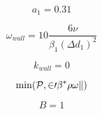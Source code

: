 {\newpage\clearpage
{}%
\begin{displaymath}
a_1 = 0.31
\end{displaymath}%
\lthtmldisplayZ
\lthtmlcheckvsize\clearpage}

{\newpage\clearpage
{}%
\begin{displaymath}
\omega_{wall} = 10 \frac{6 \nu}{\beta_1 (\Delta d_1)^2}
\end{displaymath}%
\lthtmldisplayZ
\lthtmlcheckvsize\clearpage}

{\newpage\clearpage
{}%
\begin{displaymath}
k_{wall} = 0
\end{displaymath}%
\lthtmldisplayZ
\lthtmlcheckvsize\clearpage}

{\newpage\clearpage
{}%
\begin{displaymath}
{\rm min}(\cal P, 20 \beta^* \rho \omega k)
\end{displaymath}%
\lthtmldisplayZ
\lthtmlcheckvsize\clearpage}

{\newpage\clearpage
{}%
\begin{displaymath}
B=1
\end{displaymath}%
\lthtmldisplayZ
\lthtmlcheckvsize\clearpage}



